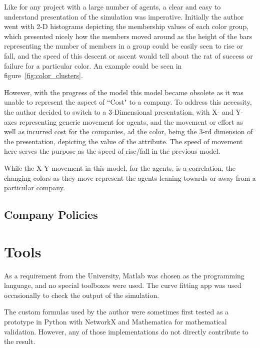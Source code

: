 Like for any project with a large number of agents, a clear and easy to understand presentation of the simulation was imperative.
Initially the author went with 2-D histograms depicting the membership values of each color group, which presented nicely how the members moved around as the height of the  bars representing the number of members in a group could be easily seen to rise or fall, and the speed of this descent or ascent would tell about the rat of success or failure for a particular color. An example could be seen in figure~\ref{fig:color_clusters}.


However, with the progress of the model this model became obsolete as it was unable to represent the aspect of ``Cost" to a company. 
To address this necessity, the author decided to switch to a 3-Dimensional presentation, with X- and Y- axes representing generic movement for agents, and the movement or effort as well as incurred cost for the companies, ad the color, being the 3-rd dimension of the presentation, depicting the value of the attribute. The speed of movement here serves the purpose as the speed of rise/fall in the previous model.

While the X-Y movement in this model, for the agents, is a correlation, the changing colors as they move represent the agents leaning towards or away from a particular company.

\subsection{Company Policies}



\section{Tools}
As a requirement from the University, Matlab was chosen as the programming language, and no special toolboxes were used.
The curve fitting app was used occasionally to check the output of the simulation.

The custom formulas used by the author were sometimes first tested as a prototype in Python with NetworkX and Mathematica for mathematical validation. However, any of those implementations do not directly contribute to the result.
